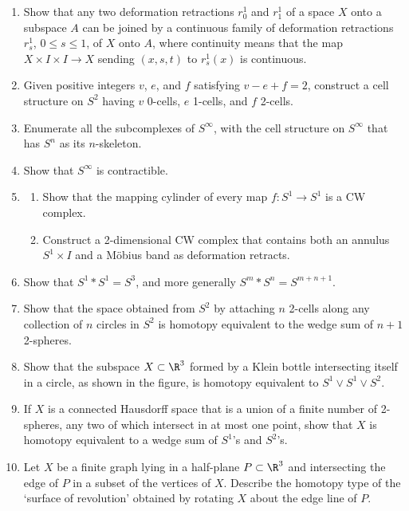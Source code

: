 \begin{enumerate}
\item Show that any two deformation retractions $r_0^1$ and $r_1^1$ of a space $X$
onto a subspace $A$ can be joined by a continuous family of deformation retractions
$r_s^1$, $0 \le s \le 1$, of $X$ onto $A$, where continuity means that the map
$X \times I \times I \to X$ sending $(x,s,t)$ to $r_s^1(x)$ is continuous.

\item Given positive integers $v$, $e$, and $f$ satisfying $v - e + f = 2$, construct a
cell structure on $S^2$ having $v$ 0-cells, $e$ 1-cells, and $f$ 2-cells.

\item Enumerate all the subcomplexes of $S^\infty$, with the cell structure on
$S^\infty$ that has $S^n$ as its $n$-skeleton.

\item Show that $S^\infty$ is contractible.

\item
\begin{enumerate}
\item[(a)] Show that the mapping cylinder of every map $f : S^1 \to S^1$ is a CW
complex.
\item[(b)] Construct a 2-dimensional CW complex that contains both an annulus
$S^1 \times I$ and a M\"obius band as deformation retracts.
\end{enumerate}

\item Show that $S^1 * S^1 = S^3$, and more generally $S^m * S^n = S^{m+n+1}$.

\item Show that the space obtained from $S^2$ by attaching $n$ 2-cells along any
collection of $n$ circles in $S^2$ is homotopy equivalent to the wedge sum of $n+1$
2-spheres.

\item Show that the subspace $X \subset \R^3$ formed by a Klein bottle intersecting
itself in a circle, as shown in the figure, is homotopy equivalent to
$S^1 \vee S^1 \vee S^2$.



\item If $X$ is a connected Hausdorff space that is a union of a finite number of
2-spheres, any two of which intersect in at most one point, show that $X$ is
homotopy equivalent to a wedge sum of $S^1$'s and $S^2$'s.

\item Let $X$ be a finite graph lying in a half-plane $P \subset \R^3$ and intersecting
the edge of $P$ in a subset of the vertices of $X$. Describe the homotopy type of the
`surface of revolution' obtained by rotating $X$ about the edge line of $P$.


\end{enumerate}
